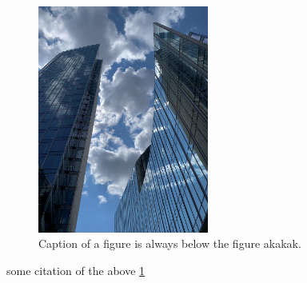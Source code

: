 \begin{figure}
\centering
\includegraphics[width=0.5\textwidth]{./graf/test_image.jpg}
\caption{Caption of a figure is always below the figure akakak.}
\label{fig:duped_image4}
\end{figure}

some citation of the above \ref{fig:duped_image4}
